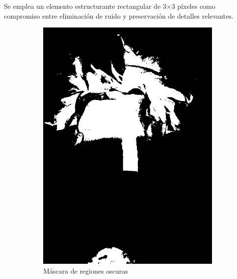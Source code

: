 Se emplea un elemento estructurante rectangular de 3×3 píxeles como compromiso entre eliminación de ruido y preservación de detalles relevantes.

\begin{figure}[H]
\centering
\begin{subfigure}[b]{0.48\textwidth}
    \centering
    \includegraphics[width=\textwidth]{imagenes/clasificador_3_negro.jpg}
    \caption{Máscara de regiones oscuras}
\end{subfigure}
\hfill
\begin{subfigure}[b]{0.48\textwidth}
    \centering

\end{subfigure}
\end{figure}
